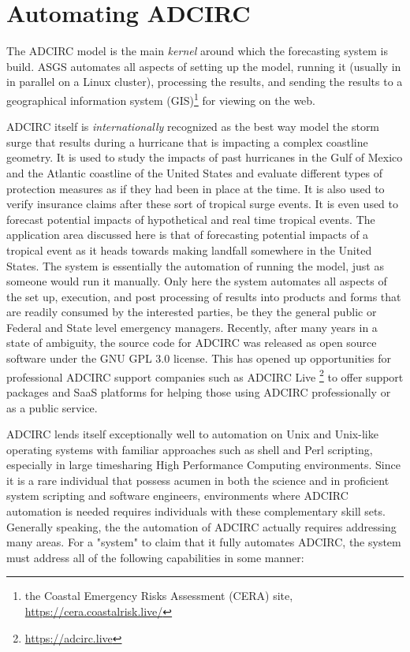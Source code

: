 \documentclass{article}
\begin{document}
\section{Automating ADCIRC}

The ADCIRC model is the main \textit{kernel} around which the forecasting system
is build. ASGS automates all aspects of setting up the model, running it
(usually in in parallel on a Linux cluster), processing the results, and sending
the results to a geographical information system (GIS)\footnote{the Coastal
Emergency Risks Assessment (CERA) site, \url{https://cera.coastalrisk.live/}}
for viewing on the web.

ADCIRC itself is \textit{internationally} recognized as the best way model the storm
surge that results during a hurricane that is impacting a complex coastline
geometry. It is used to study the impacts of past hurricanes in the Gulf of
Mexico and the Atlantic coastline of the United States and evaluate different
types of protection measures as if they had been in place at the time. It is
also used to verify insurance claims after these sort of tropical surge events.
It is even used to forecast potential impacts of hypothetical and real time
tropical events. The application area discussed here is that of forecasting
potential impacts of a tropical event as it heads towards making landfall
somewhere in the United States. The system is essentially the automation of
running the model, just as someone would run it manually. Only here the system
automates all aspects of the set up, execution, and post processing of results
into products and forms that are readily consumed by the interested parties, be
they the general public or Federal and State level emergency managers.
Recently, after many years in a state of ambiguity, the source code for ADCIRC
was released as open source software under the GNU GPL 3.0 license. This has
opened up opportunities for professional ADCIRC support companies such as ADCIRC
Live \footnote{\url{https://adcirc.live}} to offer support packages and SaaS
platforms for helping those using ADCIRC professionally or as a public service.

ADCIRC lends itself exceptionally well to automation on Unix and Unix-like
operating systems with familiar approaches such as shell and Perl scripting,
especially in large timesharing High Performance Computing environments. Since
it is a rare individual that possess acumen in both the science and in
proficient system scripting and software engineers, environments where ADCIRC
automation is needed requires individuals with these complementary skill sets.
Generally speaking, the the automation of ADCIRC actually requires addressing
many areas. For a "system" to claim that it fully automates ADCIRC, the system
must address all of the following capabilities in some manner:
\end{document}
